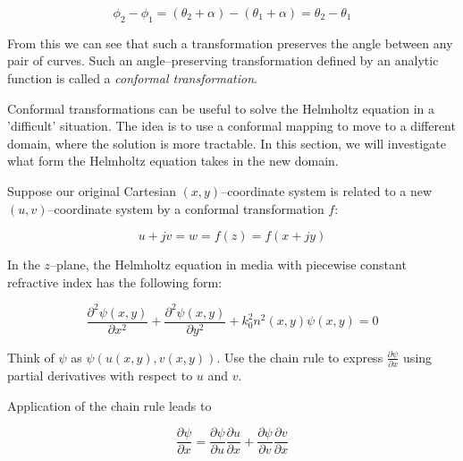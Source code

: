 \begin{equation}
\phi_2 - \phi_1 = (\theta_2 + \alpha) - (\theta_1 + \alpha) = \theta_2 -
\theta_1
\end{equation} 

From this we can see that such a transformation preserves the angle between any pair of curves. Such an angle--preserving transformation defined by an analytic function is called a \emph{conformal transformation}.



Conformal transformations can be useful to solve the Helmholtz equation in a 'difficult' situation. The idea is to use a conformal mapping to move to a different domain, where the solution is more tractable. In this section, we will investigate what form the Helmholtz equation takes in the new domain.

Suppose our original Cartesian $(x,y)$--coordinate system is related to a new $(u,v)$--coordinate system by a conformal transformation $f$:

\begin{equation}
u+jv = w = f(z) = f(x+jy)
\end{equation} 

In the $z$--plane, the Helmholtz equation in media with piecewise constant refractive index has the following form:

\begin{equation}
\frac{\partial^2 \psi(x,y)}{\partial x^2} + \frac{\partial^2 \psi(x,y)}{\partial y^2} + k_0^2 n^2(x,y) \psi(x,y) = 0
\end{equation}

\begin{cue}
Think of $\psi$ as $\psi\left(u(x,y), v(x,y)\right)$. Use the chain rule to express $\frac{\partial \psi}{\partial x}$ using partial derivatives with respect to $u$ and $v$.
\end{cue}

\noindent{}Application of the chain rule leads to

\begin{equation}
\frac{\partial \psi}{\partial x} = \frac{\partial \psi}{\partial u}
\frac{\partial u}{\partial x} + \frac{\partial \psi}{\partial v} \frac{\partial
v}{\partial x}
\end{equation} 



